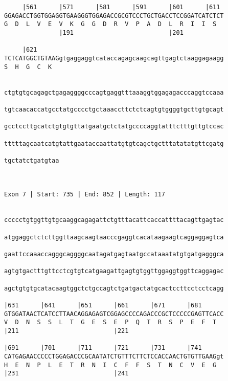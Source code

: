 \documentclass{article}
\begin{document}
\begin{Verbatim}
     |561      |571      |581      |591      |601      |611 
GGAGACCTGGTGGAGGTGAAGGGTGGAGACCGCGTCCCTGCTGACCTCCGGATCATCTCT
G  D  L  V  E  V  K  G  G  D  R  V  P  A  D  L  R  I  I  S  
               |191                          |201           
  
     |621                                                   
TCTCATGGCTGTAAGgtgaggaggtcataccagagcaagcagttgagtctaaggagaagg
S  H  G  C  K                                               
                                                            
  
ctgtgtgcagagctgagaggggcccagtgaggtttaaaggtggagagacccaggtccaaa
                                                            
tgtcaacaccatgcctatgcccctgctaaaccttctctcagtgtggggtgcttgtgcagt
                                                            
gcctccttgcatctgtgtgttatgaatgctctatgccccaggtatttctttgttgtccac
                                                            
tttttagcaatcatgtattgaataccaattatgtgtcagctgctttatatatgttcgatg
                                                            
tgctatctgatgtaa
               
               
 
Exon 7 | Start: 735 | End: 852 | Length: 117


ccccctgtggttgtgcaaggcagagattctgtttacattcaccattttacagttgagtac
                                                            
atggaggctctcttggttaagcaagtaacccgaggtcacataagaagtcaggaggagtca
                                                            
gaattccaaaccagggcaggggcaatagatgagtaatgccataaatatgtgatgagggca
                                                            
agtgtgactttgttcctcgtgtcatgaagattgagtgtggttggaggtggttcaggagac
                                                            
agctgtgtgcatacaagtggctctgccagtctgatgactatgcactccttcctcctcagg
                                                            
|631      |641      |651      |661      |671      |681      
GTGGATAACTCATCCTTAACAGGAGAGTCGGAGCCCCAGACCCGCTCCCCCGAGTTCACC
V  D  N  S  S  L  T  G  E  S  E  P  Q  T  R  S  P  E  F  T  
|211                          |221                          
  
|691      |701      |711      |721      |731      |741      
CATGAGAACCCCCTGGAGACCCGCAATATCTGTTTCTTCTCCACCAACTGTGTTGAAGgt
H  E  N  P  L  E  T  R  N  I  C  F  F  S  T  N  C  V  E  G  
|231                          |241                          
  

\end{Verbatim}
\end{document}
